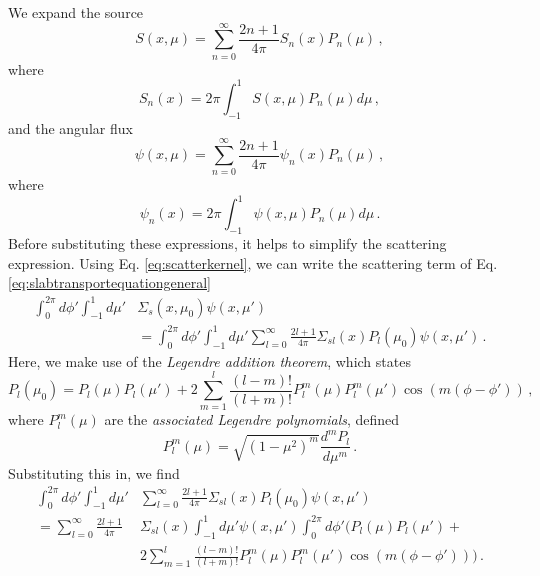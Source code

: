 We expand the source
\begin{equation}
 S(x,\mu) = \sum^{\infty}_{n=0} \frac{2n+1}{4\pi} S_{n}(x)P_{n}(\mu) \, , 
 \label{eq:sourceexp}
\end{equation}
where
\begin{equation}
 S_{n}(x) = 2\pi \int^{1}_{-1} S(x,\mu) P_n(\mu) d\mu \, ,
\end{equation}
and the angular flux
\begin{equation}
 \psi(x,\mu) = \sum^{\infty}_{n=0} \frac{2n+1}{4\pi} \psi_{n}(x)P_{n}(\mu) \, , 
 \label{eq:psiexp}
\end{equation}
where
\begin{equation}
 \psi_{n}(x) = 2\pi \int^{1}_{-1} \psi(x,\mu) P_n(\mu) d\mu \, .
\end{equation}
Before substituting these expressions, it helps to simplify the 
scattering expression.  Using Eq. \ref{eq:scatterkernel}, we can write the 
scattering term of Eq. \ref{eq:slabtransportequationgeneral}
\begin{equation}
\begin{split}
  \int^{2\pi}_0 d\phi' \int^1_{-1} d\mu'  
    & \Sigma_s(x,\mu_0)\psi(x,\mu')  \\
    &= \int^{2\pi}_0 d\phi' \int^1_{-1} d\mu' 
           \sum^{\infty}_{l=0} \frac{2l+1}{4\pi} 
              \Sigma_{sl}(x)P_{l}(\mu_0) \psi(x,\mu') \, .
\end{split}
\end{equation}
Here, we make use of the \textit{Legendre addition theorem}, which states 
\begin{equation}
 P_l(\mu_0) = P_l(\mu)P_l(\mu') 
    + 2\sum^l_{m=1}\frac{(l-m)!}{(l+m)!} 
         P^m_l(\mu)P^m_l(\mu')\cos(m(\phi-\phi')) \, ,
\end{equation}
where $P^m_l(\mu)$ are the \textit{associated Legendre polynomials}, defined
\begin{equation}
 P^m_l(\mu) = \sqrt{(1-\mu^2)^m} \frac{d^m P_l}{d\mu^m} \, .
\end{equation}
Substituting this in, we find
\begin{equation}
\begin{split}
   \int^{2\pi}_0 d\phi' \int^1_{-1} d\mu'  
      & \sum^{\infty}_{l=0} \frac{2l+1}{4\pi}  
         \Sigma_{sl}(x)P_{l}(\mu_0) \psi(x,\mu') \\
  = \sum^{\infty}_{l=0} \frac{2l+1}{4\pi} & \Sigma_{sl}(x) \int^1_{-1} d\mu'  \psi(x,\mu')   \int^{2\pi}_0 d\phi' \Bigg ( P_l(\mu)P_l(\mu') + \\  
  & 2\sum^l_{m=1}\frac{(l-m)!}{(l+m)!}P^m_l(\mu)P^m_l(\mu')\cos(m(\phi-\phi'))\Bigg )\, .
\end{split}
\end{equation}
